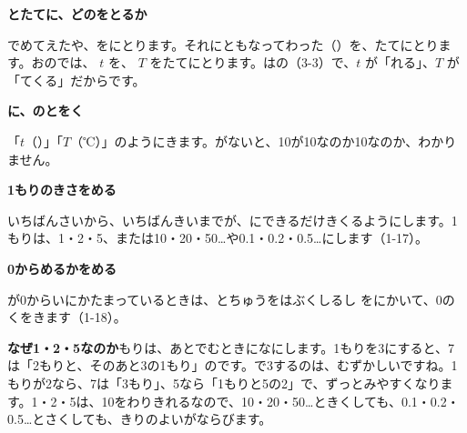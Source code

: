 \begin{enumerate}[label={\bkcircled[bkTheme]{\arabic*}}, leftmargin=2.4\zw, itemsep=2pt, topsep=3pt]
\item \textbf{とたてに、どのをとるか}\par\noindent {}でめてえたや、をにとります。それにともなってわった（）を、たてにとります。おのでは、 $t$ を、 $T$ をたてにとります。はの（3-3）で、$t$ が「れる」、$T$ が「てくる」だからです。
\item \textbf{に、のとをく}\par\noindent 「$t$（）」「$T$（℃）」のようにきます。がないと、10が10なのか10なのか、わかりません。
\item \textbf{1もりのきさをめる}\par\noindent いちばんさいから、いちばんきいまでが、にできるだけきくるようにします。1もりは、1・2・5、または10・20・50…や0.1・0.2・0.5…にします（1-17）。
\item \textbf{0からめるかをめる}\par\noindent {}が0からいにかたまっているときは、とちゅうをはぶくしるし \bkthrenami をにかいて、0のくをきます（1-18）。
\end{enumerate}

\textbf{なぜ1・2・5なのか}\quad {}もりは、あとでむときになにします。1もりを3にすると、7は「2もりと、そのあと3の1もり」のです。で3するのは、むずかしいですね。1もりが2なら、7は「3もり」、5なら「1もりと5の2」で、ずっとみやすくなります。1・2・5は、10をわりきれるなので、10・20・50…ときくしても、0.1・0.2・0.5…とさくしても、きりのよいがならびます。

